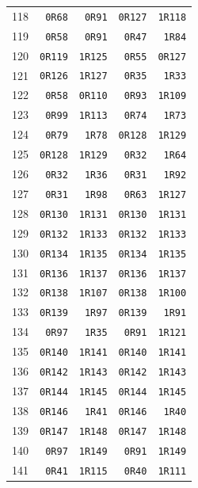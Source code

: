 \begin{longtable}{rrrrr}
118 & \texttt{0R68} & \texttt{0R91} & \texttt{0R127} & \texttt{1R118}\\
119 & \texttt{0R58} & \texttt{0R91} & \texttt{0R47} & \texttt{1R84}\\
120 & \texttt{0R119} & \texttt{1R125} & \texttt{0R55} & \texttt{0R127}\\
121 & \texttt{0R126} & \texttt{1R127} & \texttt{0R35} & \texttt{1R33}\\
122 & \texttt{0R58} & \texttt{0R110} & \texttt{0R93} & \texttt{1R109}\\
123 & \texttt{0R99} & \texttt{1R113} & \texttt{0R74} & \texttt{1R73}\\
124 & \texttt{0R79} & \texttt{1R78} & \texttt{0R128} & \texttt{1R129}\\
125 & \texttt{0R128} & \texttt{1R129} & \texttt{0R32} & \texttt{1R64}\\
126 & \texttt{0R32} & \texttt{1R36} & \texttt{0R31} & \texttt{1R92}\\
127 & \texttt{0R31} & \texttt{1R98} & \texttt{0R63} & \texttt{1R127}\\
128 & \texttt{0R130} & \texttt{1R131} & \texttt{0R130} & \texttt{1R131}\\
129 & \texttt{0R132} & \texttt{1R133} & \texttt{0R132} & \texttt{1R133}\\
130 & \texttt{0R134} & \texttt{1R135} & \texttt{0R134} & \texttt{1R135}\\
131 & \texttt{0R136} & \texttt{1R137} & \texttt{0R136} & \texttt{1R137}\\
132 & \texttt{0R138} & \texttt{1R107} & \texttt{0R138} & \texttt{1R100}\\
133 & \texttt{0R139} & \texttt{1R97} & \texttt{0R139} & \texttt{1R91}\\
134 & \texttt{0R97} & \texttt{1R35} & \texttt{0R91} & \texttt{1R121}\\
135 & \texttt{0R140} & \texttt{1R141} & \texttt{0R140} & \texttt{1R141}\\
136 & \texttt{0R142} & \texttt{1R143} & \texttt{0R142} & \texttt{1R143}\\
137 & \texttt{0R144} & \texttt{1R145} & \texttt{0R144} & \texttt{1R145}\\
138 & \texttt{0R146} & \texttt{1R41} & \texttt{0R146} & \texttt{1R40}\\
139 & \texttt{0R147} & \texttt{1R148} & \texttt{0R147} & \texttt{1R148}\\
140 & \texttt{0R97} & \texttt{1R149} & \texttt{0R91} & \texttt{1R149}\\
141 & \texttt{0R41} & \texttt{1R115} & \texttt{0R40} & \texttt{1R111}\\

\end{longtable}
